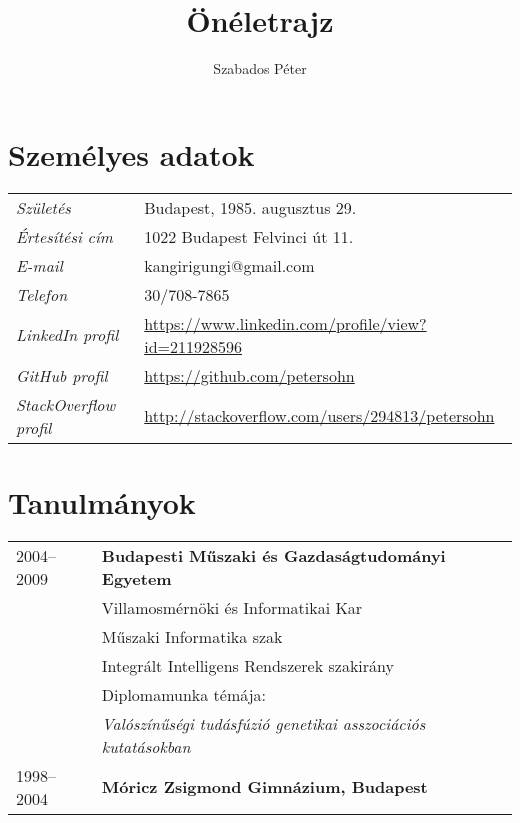 \documentclass[a4paper,10pt]{article}
\title{\textbf{Önéletrajz}}
\author{Szabados Péter}
\newcommand{\pont}[1]{\emph{#1}}
\begin{document}
\maketitle

\section*{Személyes adatok}
\begin{tabular}{ll}
 \pont{Születés}&Budapest, 1985. augusztus 29.\\
 \pont{Értesítési cím}&1022 Budapest Felvinci út 11.\\
 \pont{E-mail}&kangirigungi@gmail.com\\
 \pont{Telefon}&30/708-7865\\
 \pont{LinkedIn profil}&\href{https://www.linkedin.com/profile/view?id=211928596}{https://www.linkedin.com/profile/view?id=211928596}\\
 \pont{GitHub profil}&\href{https://github.com/petersohn}{https://github.com/petersohn}\\
 \pont{StackOverflow profil}&\href{http://stackoverflow.com/users/294813/petersohn}{http://stackoverflow.com/users/294813/petersohn}\\
\end{tabular}

\section*{Tanulmányok}
\begin{tabular}{ll}
 2004--2009
  &\textbf{Budapesti Műszaki és Gazdaságtudományi Egyetem}\\
  &Villamosmérnöki és Informatikai Kar\\
  &Műszaki Informatika szak\\
  &Integrált Intelligens Rendszerek szakirány\\
  &Diplomamunka témája:\\
  &\emph{Valószínűségi tudásfúzió genetikai asszociációs kutatásokban}\\
  1998--2004&\textbf{Móricz Zsigmond Gimnázium, Budapest}
\end{tabular}
\end{document}
